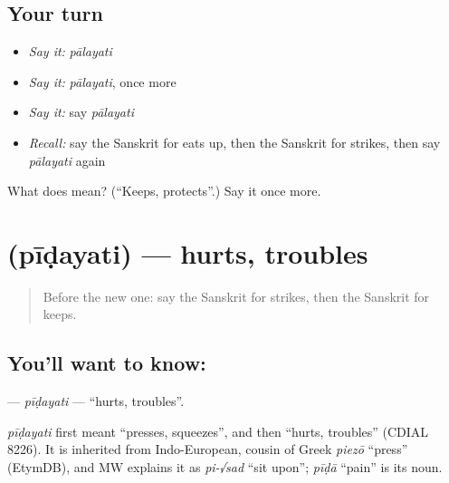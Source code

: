 \subsection*{Your turn}
\begin{itemize}
\raggedright
  \item \emph{Say it:} \emph{pālayati}
  \item \emph{Say it:} \emph{pālayati}, once more
  \item \emph{Say it:} say \emph{pālayati}
  \item \emph{Recall:} say the Sanskrit for eats up, then the Sanskrit for strikes, then say \emph{pālayati} again
\end{itemize}

\begin{tcolorbox}[breakable,colback=teal!4,colframe=teal!35!black,title={Before you move on}]
What does  mean? (\textquotedblleft{}Keeps, protects\textquotedblright{}.) Say it once more.
\end{tcolorbox}
\section[\texorpdfstring{\sk{पीडयति} (pīḍayati)}{पीडयति (pīḍayati)}]{ (pīḍayati) — hurts, troubles}

\label{lesson:SA-C174-pidayati}



\begin{quote}
Before the new one: say the Sanskrit for strikes, then the Sanskrit for keeps.
\end{quote}

\subsection*{You'll want to know: }
\textbf{} — \emph{pīḍayati} — \textquotedblleft{}hurts, troubles\textquotedblright{}.

\begin{cousinweb}
\emph{pīḍayati} first meant \textquotedblleft{}presses, squeezes\textquotedblright{}, and then \textquotedblleft{}hurts, troubles\textquotedblright{} (CDIAL 8226). It is inherited from Indo-European, cousin of Greek \emph{piezō} \textquotedblleft{}press\textquotedblright{} (EtymDB), and MW explains it as \emph{pi-√sad} \textquotedblleft{}sit upon\textquotedblright{}; \emph{pīḍā} \textquotedblleft{}pain\textquotedblright{} is its noun.
\end{cousinweb}

